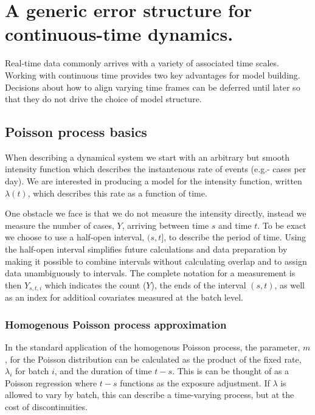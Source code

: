 
\chapter{A generic error structure for continuous-time dynamics.}

Real-time data commonly arrives with a variety of associated time
scales. Working with continuous time provides two key advantages
for model building.  Decisions about how to align varying time frames can be deferred
until later so that they do not drive the choice of model structure.


\section{Poisson process basics}

When describing a dynamical system we start with an arbitrary but smooth
intensity function which describes the instantenous rate of events
(e.g.- cases per day).  We are interested in producing a model for the
intensity function, written $\lambda(t)$, which describes this rate 
as a function of time.  

One obstacle we face is that we do not measure
the intensity directly, instead we measure the number of cases, $Y$,
arriving between time $s$ and time $t$.  To be exact we choose to use a  
half-open interval, $(s,t]$, to describe the period of time.  Using the
half-open interval simplifies future calculations and data preparation
by making it possible to combine intervals without calculating overlap
and to assign data unambiguously to intervals.  The complete notation
for a measurement is then $Y_{s,t,i}$ which indicates the count ($Y$),
the ends of the interval $(s,t)$, as well as an index for additioal 
covariates measured at the batch level.


\subsection{Homogenous Poisson process approximation}

In the standard application of the homogenous Poisson process, the
parameter, $m$, for the Poisson distribution can be 
calculated as the product of the fixed rate, $\lambda_i$ for batch $i$, and the
duration of time $t-s$.  This is can be thought of as a Poisson
regression where $t-s$ functions as the exposure adjustment. If $\lambda$ is 
allowed to vary by batch, this can describe a time-varying process, but at the 
cost of discontinuities.

